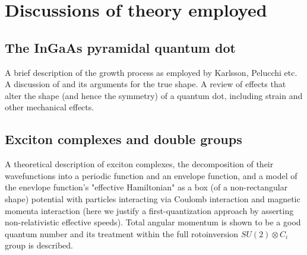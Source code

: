 \section{Discussions of theory employed}

\subsection{The InGaAs pyramidal quantum dot} \label{sec:growth}
A brief description of the growth process as employed by Karlsson, Pelucchi etc. A discussion of \cite{hexagon} and its arguments for the true shape. A review of effects that alter the shape (and hence the symmetry) of a quantum dot, including strain and other mechanical effects.

\subsection{Exciton complexes and double groups}
A theoretical description of exciton complexes, the decomposition of their wavefunctions into a periodic function and an envelope function, and a model of the enevlope function's "effective Hamiltonian" as a box (of a non-rectangular shape) potential with particles interacting via Coulomb interaction and magnetic momenta interaction (here we justify a first-quantization approach by asserting non-relativistic effective speeds). Total angular momentum is shown to be a good quantum number and its treatment within the full rotoinversion $SU(2)\otimes C_i$ group is described.

